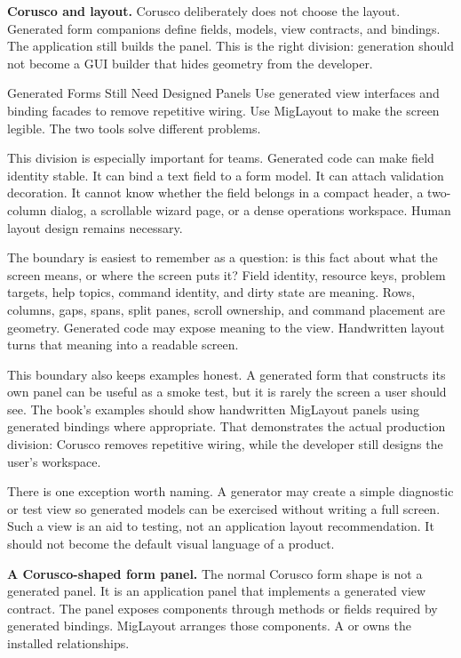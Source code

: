 \textbf{Corusco and layout.}
Corusco deliberately does not choose the layout. Generated form companions define fields, models, view contracts, and bindings. The application still builds the panel. This is the right division: generation should not become a GUI builder that hides geometry from the developer.

\begin{coruscobox}{Generated Forms Still Need Designed Panels}
Use generated view interfaces and binding facades to remove repetitive wiring. Use MigLayout to make the screen legible. The two tools solve different problems.
\end{coruscobox}

This division is especially important for teams. Generated code can make field identity stable. It can bind a text field to a form model. It can attach validation decoration. It cannot know whether the field belongs in a compact header, a two-column dialog, a scrollable wizard page, or a dense operations workspace. Human layout design remains necessary.

The boundary is easiest to remember as a question: is this fact about what the
screen means, or where the screen puts it? Field identity, resource keys,
problem targets, help topics, command identity, and dirty state are meaning.
Rows, columns, gaps, spans, split panes, scroll ownership, and command placement
are geometry. Generated code may expose meaning to the view. Handwritten layout
turns that meaning into a readable screen.

This boundary also keeps examples honest. A generated form that constructs its
own panel can be useful as a smoke test, but it is rarely the screen a user
should see. The book's examples should show handwritten MigLayout panels using
generated bindings where appropriate. That demonstrates the actual production
division: Corusco removes repetitive wiring, while the developer still designs
the user's workspace.

There is one exception worth naming. A generator may create a simple diagnostic
or test view so generated models can be exercised without writing a full screen.
Such a view is an aid to testing, not an application layout recommendation. It
should not become the default visual language of a product.

\textbf{A Corusco-shaped form panel.}
The normal Corusco form shape is not a generated panel. It is an application panel that implements a generated view contract. The panel exposes components through methods or fields required by generated bindings. MigLayout arranges those components. A  or  owns the installed relationships.

